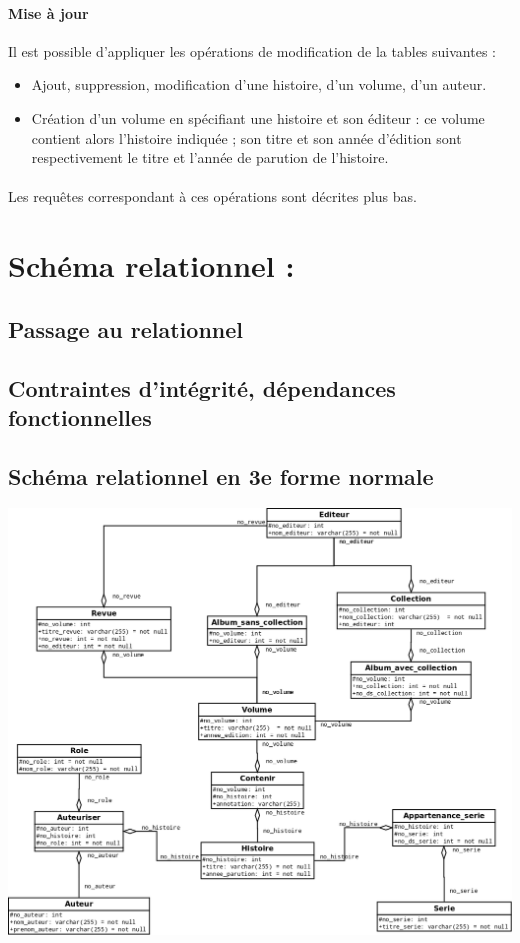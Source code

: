 \documentclass[12pt]{report}
\begin{document}
\paragraph{Mise à jour}
Il est possible d'appliquer les opérations de modification de la tables
suivantes :
\begin{itemize}
	\item Ajout, suppression, modification d’une histoire, d’un volume, d’un auteur.
	\item Création d'un volume en spécifiant une histoire et son éditeur : ce
		volume contient alors l'histoire indiquée ; son titre et son année
		d’édition sont respectivement le titre et l'année de parution de
		l'histoire.
\end{itemize}

\paragraph{}
Les requêtes correspondant à ces opérations sont décrites plus bas.

\section{Schéma relationnel :}

\subsection{Passage au relationnel}

\subsection{Contraintes d'intégrité, dépendances fonctionnelles}

\subsection{Schéma relationnel en 3e forme normale}

\noindent\includegraphics[width=\textwidth]{schema-relation}
\end{document}

